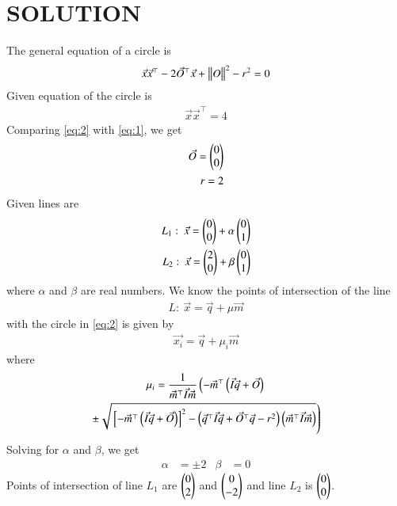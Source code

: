 \documentclass[journal,12pt,twocolumn]{IEEEtran}
\begin{document}
\section*{SOLUTION}
The general equation of a circle is 
\begin{align}
\label{eq:1}
\Vec{x}\Vec{x}^\top - 2 \Vec{O}^\top \Vec{x} + \big\lVert O\big\rVert^{2}-r^2=0
\end{align}
Given equation of the circle is
\begin{align}
\label{eq:2}
\Vec{x}\Vec{x}^\top = 4
\end{align}
Comparing \eqref{eq:2} with \eqref{eq:1}, we get
\begin{align}
\label{eq:3}
\Vec{O}=\begin{pmatrix}0 \\ 0\end{pmatrix}\\
\label{eq:4}
r=2
\end{align}
Given lines are
\begin{align}
\label{eq:5}
L_{1}: \: \Vec{x}=\begin{pmatrix}0 \\ 0\end{pmatrix} + \alpha \begin{pmatrix}0 \\ 1\end{pmatrix} \\
\label{eq:6}
L_{2}: \: \Vec{x}=\begin{pmatrix}2 \\ 0\end{pmatrix} + \beta \begin{pmatrix}0 \\ 1\end{pmatrix}
\end{align}
where $\alpha$ and $\beta$ are real numbers.
We know the points of intersection of the line
\begin{align}
\label{eq:7}
L: \: \Vec{x}=\Vec{q}+\mu\Vec{m}
\end{align}
with the circle in \eqref{eq:2} is given by 
\begin{align}
\label{eq:8}
\Vec{x_{i}}=\Vec{q}+\mu_{i}\Vec{m}
\end{align}
where 
\begin{multline*}
\mu_{i} = \frac{1}{\Vec{m}^\top \Vec{I}\Vec{m}}\left(-\Vec{m}^\top\left(\Vec{I}\Vec{q}+\Vec{O}\right)\right.\\
\left.\pm \sqrt{{}\left[-\Vec{m}^\top\left(\Vec{I}\Vec{q}+\Vec{O}\right)\right]^2-\left(\Vec{q}^\top\Vec{I}\Vec{q}+\Vec{O}^\top\Vec{q}-r^2\right)\left(\Vec{m}^\top \Vec{I}\Vec{m}\right)}\right)
\end{multline*}
Solving for $\alpha$ and $\beta$, we get
\begin{align}
\label{eq:10}
\alpha&=\pm 2 & \beta&=0
\end{align}
Points of intersection of line $L_{1}$ are $\begin{pmatrix}0\\2\end{pmatrix}$ and $\begin{pmatrix}0 \\ -2\end{pmatrix}$ and line $L_{2}$ is $\begin{pmatrix}0 \\ 0\end{pmatrix}$.\\
\end{document}
